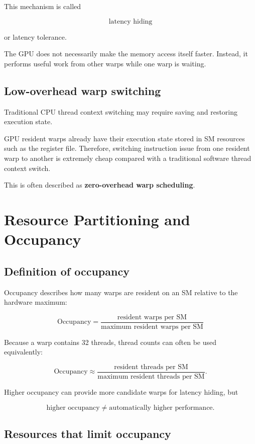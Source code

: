 \documentclass[11pt,a4paper]{article}
\begin{document}
This mechanism is called

\[
\boxed{
\text{latency hiding}
}
\]

or latency tolerance.

The GPU does not necessarily make the memory access itself faster. Instead, it performs useful work from other warps while one warp is waiting.

\subsection{Low-overhead warp switching}

Traditional CPU thread context switching may require saving and restoring execution state.

GPU resident warps already have their execution state stored in SM resources such as the register file. Therefore, switching instruction issue from one resident warp to another is extremely cheap compared with a traditional software thread context switch.

This is often described as \textbf{zero-overhead warp scheduling}.

\section{Resource Partitioning and Occupancy}

\subsection{Definition of occupancy}

Occupancy describes how many warps are resident on an SM relative to the hardware maximum:

\[
\boxed{
\text{Occupancy}
=
\frac{\text{resident warps per SM}}
{\text{maximum resident warps per SM}}
}
\]

Because a warp contains 32 threads, thread counts can often be used equivalently:

\[
\text{Occupancy}
\approx
\frac{\text{resident threads per SM}}
{\text{maximum resident threads per SM}}.
\]

Higher occupancy can provide more candidate warps for latency hiding, but

\[
\boxed{
\text{higher occupancy}
\neq
\text{automatically higher performance}.
}
\]

\subsection{Resources that limit occupancy}
\end{document}
